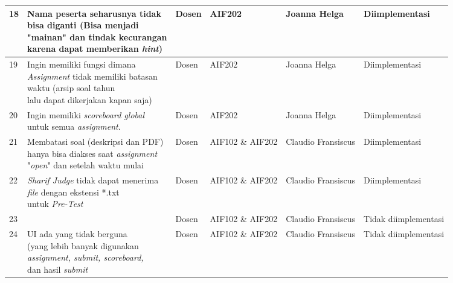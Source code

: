 \begin{table}[H]
{\begin{tabular}{|l|l|l|l|l|l|}
		18 & \makecell[l]{Nama peserta seharusnya tidak \\ bisa diganti (Bisa menjadi \\ "mainan" dan tindak kecurangan \\ karena dapat memberikan \textit{hint})} & Dosen & AIF202 & Joanna Helga & Diimplementasi\\ \hline
		19 & \makecell[l]{Ingin memiliki fungsi dimana \\ \textit{Assignment} tidak memiliki batasan \\ waktu (arsip soal tahun \\ lalu dapat dikerjakan kapan saja)} & Dosen & AIF202 & Joanna Helga & Diimplementasi\\ \hline
		20 & \makecell[l]{Ingin memiliki \textit{scoreboard global} \\ untuk semua \textit{assignment}.} & Dosen & AIF202 & Joanna Helga & Diimplementasi\\ \hline
		21 & \makecell[l]{Membatasi soal (deskripsi dan PDF) \\ hanya bisa diakses saat \textit{assignment} \\ "\textit{open}" dan setelah waktu mulai} & Dosen & AIF102 \& AIF202 & Claudio Fransiscus & Diimplementasi\\ \hline
		22 & \makecell[l]{\textit{Sharif Judge} tidak dapat menerima \\ \textit{file} dengan ekstensi *.txt \\ untuk \textit{Pre-Test}} & Dosen & AIF102 \& AIF202 & Claudio Fransiscus & Diimplementasi\\ \hline
		23 & \makecell[l]{UI masih merepotkan} & Dosen & AIF102 \& AIF202 & Claudio Fransiscus & Tidak diimplementasi\\ \hline
		24 & \makecell[l]{UI ada yang tidak berguna \\ (yang lebih banyak digunakan \\ \textit{assignment, submit, scoreboard,} \\ dan hasil \textit{submit}} & Dosen & AIF102 \& AIF202 & Claudio Fransiscus & Tidak diimplementasi\\

		\bottomrule
		
	\end{tabular}}
\end{table}

